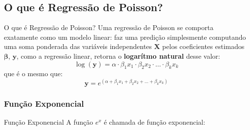 \subsection{O que é Regressão de Poisson?}
\begin{frame}{O que é Regressão de Poisson?}
    Uma regressão de Poisson se comporta exatamente como um modelo linear:
    faz uma predição simplesmente computando uma soma ponderada das variáveis
    independentes $\mathbf{X}$ pelos coeficientes estimados $\boldsymbol{\beta}$,
    $\boldsymbol{y}$, como a regressão linear, retorna o \textbf{logarítmo natural}
    desse valor:
    $$
    \log(\boldsymbol{y})= \alpha \cdot \beta_1 x_1 \cdot \beta_2 x_2 \cdot \ldots \cdot \beta_k x_k
    $$
    que é o mesmo que:
    $$
    \boldsymbol{y} = e^{(\alpha + \beta_1 x_1 + \beta_2 x_2 + \ldots + \beta_k x_k)}
    $$
\end{frame}

\subsubsection{Função Exponencial}
\begin{frame}{Função Exponencial}
    A função $e^x$ é chamada de função exponencial:
\end{frame}

